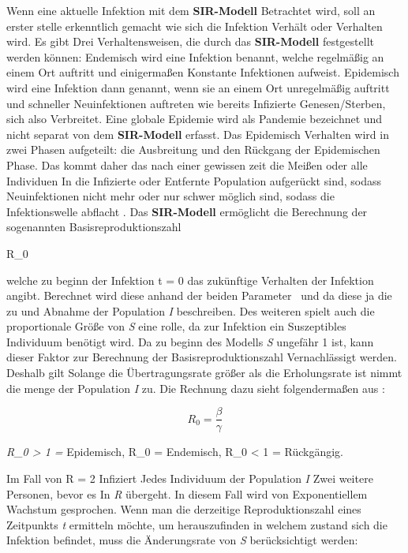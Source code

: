 \documentclass[12pt]{scrartcl} %
\begin{document}
Wenn eine aktuelle Infektion mit dem \textbf{SIR-Modell} Betrachtet wird, soll an erster stelle erkenntlich gemacht wie sich die Infektion Verhält oder Verhalten wird. Es gibt Drei Verhaltensweisen, die durch das \textbf{SIR-Modell} festgestellt werden können: Endemisch wird eine Infektion benannt, welche regelmäßig an einem Ort auftritt und einigermaßen Konstante Infektionen aufweist. Epidemisch wird eine Infektion dann genannt, wenn sie an einem Ort unregelmäßig auftritt und schneller Neuinfektionen auftreten wie bereits Infizierte Genesen/Sterben, sich also Verbreitet. Eine globale Epidemie wird als Pandemie bezeichnet und nicht separat von dem \textbf{SIR-Modell} erfasst. Das Epidemisch Verhalten wird in zwei Phasen aufgeteilt: die Ausbreitung und den Rückgang der Epidemischen Phase. Das kommt daher das nach einer gewissen zeit die Meißen oder alle Individuen In die Infizierte oder Entfernte Population aufgerückt sind, sodass Neuinfektionen nicht mehr oder nur schwer möglich sind, sodass die Infektionswelle abflacht \cite{3,5}. Das \textbf{SIR-Modell} ermöglicht die Berechnung der sogenannten Basisreproduktionszahl 
\begin{center}
R_{0}
\end{center}
welche zu beginn der Infektion t = 0 das zukünftige Verhalten der Infektion angibt. Berechnet wird diese anhand der beiden Parameter \textbeta\ und \textgamma\space da diese ja die zu und Abnahme der Population \textit{I} beschreiben. Des weiteren spielt auch die proportionale Größe von \textit{S} eine rolle, da zur Infektion ein Suszeptibles Individuum benötigt wird. Da zu beginn des Modells \textit{S} ungefähr 1 ist, kann dieser Faktor zur Berechnung der Basisreproduktionszahl Vernachlässigt werden. Deshalb gilt Solange die Übertragungsrate \textbeta\space größer als die Erholungsrate \textgamma\space ist nimmt die menge der Population \textit{I} zu. Die Rechnung dazu sieht folgendermaßen aus \cite{6,3}:

$$ R_{0} = \frac{\beta}{\gamma} $$

\begin{center}
\textit{R_{0} > 1 =} \textnormal{Epidemisch}, R_{0}  = \textnormal{Endemisch}, R_{0} < 1 = \textnormal{Rückgängig.}
\end{center}
Im Fall von R = 2 Infiziert Jedes Individuum der Population \textit{I} Zwei weitere Personen, bevor es In \textit{R} übergeht. In diesem Fall wird von Exponentiellem Wachstum gesprochen.
Wenn man die derzeitige Reproduktionszahl eines Zeitpunkts \textit{t} ermitteln möchte, um herauszufinden in welchem zustand sich die Infektion befindet, muss die Änderungsrate von \textit{S} berücksichtigt werden:
\end{document}
